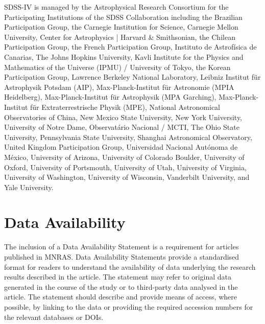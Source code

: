 \documentclass[fleqn,
usenatbib]{mnras}
\begin{document}
SDSS-IV is managed by the 
Astrophysical Research Consortium 
for the Participating Institutions 
of the SDSS Collaboration including 
the Brazilian Participation Group, 
the Carnegie Institution for Science, 
Carnegie Mellon University, Center for 
Astrophysics | Harvard \& 
Smithsonian, the Chilean Participation 
Group, the French Participation Group, 
Instituto de Astrof\'isica de 
Canarias, The Johns Hopkins 
University, Kavli Institute for the 
Physics and Mathematics of the 
Universe (IPMU) / University of 
Tokyo, the Korean Participation Group, 
Lawrence Berkeley National Laboratory, 
Leibniz Institut f\"ur Astrophysik 
Potsdam (AIP),  Max-Planck-Institut 
f\"ur Astronomie (MPIA Heidelberg), 
Max-Planck-Institut f\"ur 
Astrophysik (MPA Garching), 
Max-Planck-Institut f\"ur 
Extraterrestrische Physik (MPE), 
National Astronomical Observatories of 
China, New Mexico State University, 
New York University, University of 
Notre Dame, Observat\'ario 
Nacional / MCTI, The Ohio State 
University, Pennsylvania State 
University, Shanghai 
Astronomical Observatory, United 
Kingdom Participation Group, 
Universidad Nacional Aut\'onoma 
de M\'exico, University of Arizona, 
University of Colorado Boulder, 
University of Oxford, University of 
Portsmouth, University of Utah, 
University of Virginia, University 
of Washington, University of 
Wisconsin, Vanderbilt University, 
and Yale University.



\section*{Data Availability}

 
The inclusion of a Data Availability Statement is a requirement for articles published in MNRAS. Data Availability Statements provide a standardised format for readers to understand the availability of data underlying the research results described in the article. The statement may refer to original data generated in the course of the study or to third-party data analysed in the article. The statement should describe and provide means of access, where possible, by linking to the data or providing the required accession numbers for the relevant databases or DOIs.






\end{document}
